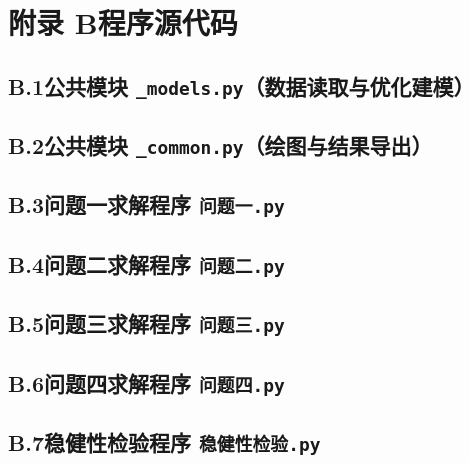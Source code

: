 \newpage
\makeatletter
\let\@oldaddcontentsline\addcontentsline
\renewcommand{\addcontentsline}[3]{}
\section*{附录 B\quad 程序源代码}
\let\addcontentsline\@oldaddcontentsline
\makeatother


\subsection*{B.1\quad 公共模块 \texttt{\_models.py}（数据读取与优化建模）}


\subsection*{B.2\quad 公共模块 \texttt{\_common.py}（绘图与结果导出）}


\subsection*{B.3\quad 问题一求解程序 \texttt{问题一.py}}


\subsection*{B.4\quad 问题二求解程序 \texttt{问题二.py}}


\subsection*{B.5\quad 问题三求解程序 \texttt{问题三.py}}


\subsection*{B.6\quad 问题四求解程序 \texttt{问题四.py}}


\subsection*{B.7\quad 稳健性检验程序 \texttt{稳健性检验.py}}

